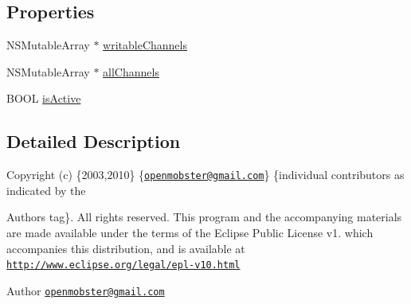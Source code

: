 \subsection*{\-Properties}
\begin{DoxyCompactItemize}
\item 
\-N\-S\-Mutable\-Array $\ast$ \hyperlink{interface_app_service_a3c6ebf6a086faf3a74b8ada51d594a50}{writable\-Channels}
\item 
\-N\-S\-Mutable\-Array $\ast$ \hyperlink{interface_app_service_ab72e2a3fbfd51e894cd1784db66f3cc8}{all\-Channels}
\item 
\-B\-O\-O\-L \hyperlink{interface_app_service_ab920054a22c43f1d93155618f4fce0cf}{is\-Active}
\end{DoxyCompactItemize}


\subsection{\-Detailed \-Description}
\-Copyright (c) \{2003,2010\} \{\href{mailto:openmobster@gmail.com}{\tt openmobster@gmail.\-com}\} \{individual contributors as indicated by the \begin{DoxyAuthor}{\-Authors}
tag\}. \-All rights reserved. \-This program and the accompanying materials are made available under the terms of the \-Eclipse \-Public \-License v1. which accompanies this distribution, and is available at \href{http://www.eclipse.org/legal/epl-v10.html}{\tt http\-://www.\-eclipse.\-org/legal/epl-\/v10.\-html}
\end{DoxyAuthor}
\begin{DoxyAuthor}{\-Author}
\href{mailto:openmobster@gmail.com}{\tt openmobster@gmail.\-com} 
\end{DoxyAuthor}


